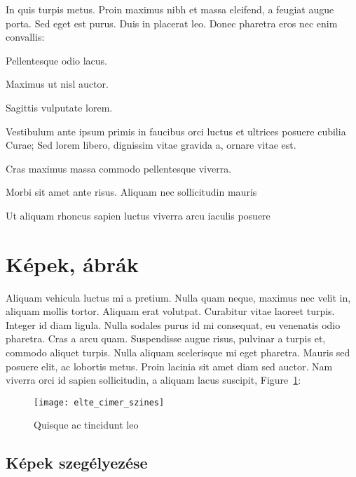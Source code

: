 \bigskip

In quis turpis metus. Proin maximus nibh et massa eleifend, a feugiat augue porta. Sed eget est purus. Duis in placerat leo. Donec pharetra eros nec enim convallis:
\begin{compactitem}
	\item Pellentesque odio lacus.
	\item Maximus ut nisl auctor.
	\item Sagittis vulputate lorem.
\end{compactitem}

\bigskip

Vestibulum ante ipsum primis in faucibus orci luctus et ultrices posuere cubilia Curae; Sed lorem libero, dignissim vitae gravida a, ornare vitae est.
\begin{compactdesc}
	\item[Cras maximus] massa commodo pellentesque viverra.
	\item[Morbi sit] amet ante risus. Aliquam nec sollicitudin mauris
	\item[Ut aliquam rhoncus sapien] luctus viverra arcu iaculis posuere
\end{compactdesc}


\section{Képek, ábrák}

Aliquam vehicula luctus mi a pretium. Nulla quam neque, maximus nec velit in, aliquam mollis tortor. Aliquam erat volutpat. Curabitur vitae laoreet turpis. Integer id diam ligula. Nulla sodales purus id mi consequat, eu venenatis odio pharetra. Cras a arcu quam. Suspendisse augue risus, pulvinar a turpis et, commodo aliquet turpis. Nulla aliquam scelerisque mi eget pharetra. Mauris sed posuere elit, ac lobortis metus. Proin lacinia sit amet diam sed auctor. Nam viverra orci id sapien sollicitudin, a aliquam lacus suscipit, Figure~\ref{fig:example-1}:

\begin{figure}[H]
	\centering
	\texttt{[image: elte\_cimer\_szines]}
	\caption{Quisque ac tincidunt leo}
	\label{fig:example-1}
\end{figure}

\subsection{Képek szegélyezése}

